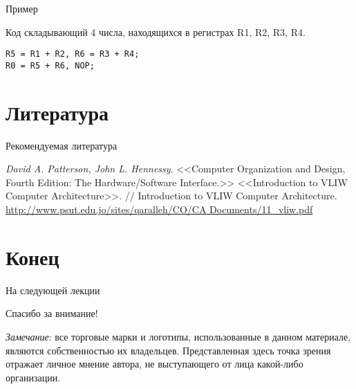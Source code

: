 \begin{frame}[fragile]{Пример}

Код складывающий 4 числа, находящихся в регистрах R1, R2, R3, R4.

\begin{lstlisting}
R5 = R1 + R2, R6 = R3 + R4;
R0 = R5 + R6, NOP;
\end{lstlisting}

\end{frame}

\section*{Литература}

\begin{frame}[allowframebreaks]{Рекомендуемая литература}
\begin{thebibliography}{99}
     \textit{David A. Patterson, John L. Hennessy}. <<Computer Organization and Design, Fourth Edition: The Hardware/Software Interface.>>
     <<Introduction to VLIW Computer Architecture>>. // Introduction to VLIW Computer Architecture. \url{http://www.psut.edu.jo/sites/qaralleh/CO/CA Documents/11_vliw.pdf}
\end{thebibliography}
\end{frame}

\section*{Конец}

\begin{frame}{На следующей лекции}
\end{frame}

\begin{frame}

{\huge{Спасибо за внимание!}\par}

\vfill

\tiny{\textit{Замечание}: все торговые марки и логотипы, использованные в данном материале, являются собственностью их владельцев. Представленная здесь точка зрения отражает личное мнение автора, не выступающего от лица какой-либо организации.}

\end{frame}


